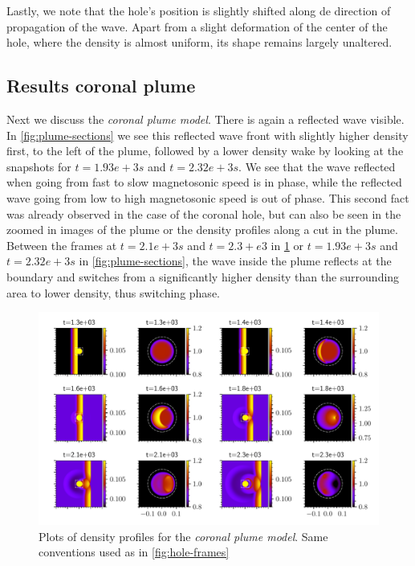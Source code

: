 Lastly, we note that the hole's position is slightly shifted along de direction of propagation of the wave.
Apart from a slight deformation of the center of the hole, where the density is almost uniform, its shape remains largely unaltered.


\subsection{Results coronal plume}
Next we discuss the \emph{coronal plume model}. There is again a reflected wave visible.
In \cref{fig:plume-sections} we see this reflected wave front with slightly higher density first, to the left of the plume, followed by a lower density wake by looking at the snapshots for $t=1.93e+3 s$ and $t=2.32e+3 s$.
We see that the wave reflected when going from fast to slow magnetosonic speed is in phase, while the reflected wave going from low to high magnetosonic speed is out of phase.
This second fact was already observed in the case of the coronal hole, but can also be seen in the zoomed in images of the plume or the density profiles along a cut in the plume.
Between the frames at $t=2.1e+3 s$ and $t=2.3+e3$ in \cref{fig:plume-frames}  or $t=1.93e+3 s$ and $t=2.32e+3 s$ in \cref{fig:plume-sections}, the wave inside the plume reflects at the boundary and switches from a significantly higher density than the surrounding area to lower density, thus switching phase.

\begin{figure}[H]
	\centering
	\includegraphics[width=\linewidth]{images/plume-frames.pdf}
	\caption{Plots of density profiles for the \emph{coronal plume model}. Same conventions used as in \cref{fig:hole-frames}}
	\label{fig:plume-frames}
\end{figure}

